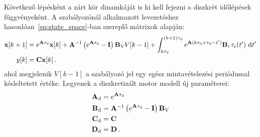 Következő lépésként a zárt kör dinamkáját is ki kell fejezni a diszkrét időlépések függvényeként. 
A szabályozónál alkalmazott levezetéshez hasonlóan~\eqref{eq:state_space}-ban szereplő mátrixok alapján:
\begin{align}\label{eq:discrete_motor_state}
    \begin{split}    
        \mathbf{x}[k+1] &= e^{\mathbf{A} \tau_{\mathrm{d}}}\mathbf{x}[k] + 
        \mathbf{A}^{-1}\left(e^{\mathbf{A} \tau_{\mathrm{d}}} - \mathbf{I}\right)\mathbf{B}_{\mathrm{V}} V[k-1] + 
        \int_{k\tau_{\mathrm{d}}}^{(k+1)\tau_{\mathrm{d}}} e^{\mathbf{A} (k\tau_{\mathrm{d}} + \tau_{\mathrm{d}}-t')}\mathbf{B}_{\mathrm{\tau}} \tau_{\mathrm{e}}(t')~\mathrm{d}t'\\
        y[k] &= \mathbf{C} \mathbf{x}[k]\,.
    \end{split}        
\end{align}
ahol megjelenik \(V[k-1]\) a szabályozó jel egy egész mintavételezési periódussal késleltetett értéke. 
Legyenek a diszkretizált motor modell új paraméterei:
\begin{align}\label{eq:discrete_motor_matrices}
    \begin{split}
        \mathbf{A}_{\mathrm{d}} &= e^{\mathbf{A}\tau_{\mathrm{d}}} \\
        \mathbf{B}_{\mathrm{d}} &= \mathbf{A}^{-1}\left(e^{\mathbf{A}\tau_{\mathrm{d}}}-\mathbf{I}\right)\mathbf{B}_{\mathrm{V}} \\
        \mathbf{C}_{\mathrm{d}} &= \mathbf{C} \\
        \mathbf{D}_{\mathrm{d}} &= \mathbf{D} \,.
    \end{split}        
\end{align}

